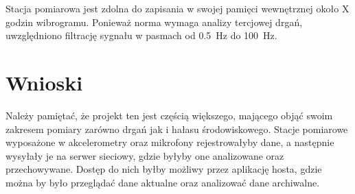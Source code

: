 \documentclass[a4paper,12pt]{mwart}
\begin{document}

Stacja pomiarowa jest zdolna do zapisania w swojej pamięci wewnętrznej około X
godzin wibrogramu. Ponieważ norma wymaga analizy tercjowej drgań, uwzględniono
filtrację sygnału w pasmach od \SI{0,5}{\hertz} do \SI{100}{\hertz}.


\section{Wnioski}


Należy pamiętać, że projekt ten jest częścią większego, mającego objąć swoim
zakresem pomiary zarówno drgań jak i hałasu środowiskowego. Stacje pomiarowe
wyposażone w akcelerometry oraz mikrofony rejestrowałyby dane, a następnie
wysyłały je na serwer sieciowy, gdzie byłyby one analizowane oraz przechowywane.
Dostęp do nich byłby możliwy przez aplikację hosta, gdzie można by było
przeglądać dane aktualne oraz analizować dane archiwalne.

\printbibliography
\end{document}
